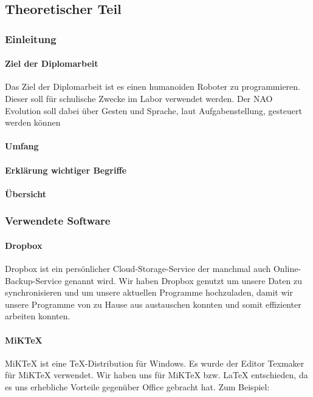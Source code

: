 \documentclass[12pt]{article}  %
\begin{document}
\addtocounter{page}{1}
\newpage
\tableofcontents
\newpage

\null\vfill
\begin{center}
 \part[Theoretischer Teil]{\centering Theoretischer Teil} 
\end{center}
\vfill
\newpage


\section{Einleitung}
	\subsection{Ziel der Diplomarbeit}
		Das Ziel der Diplomarbeit ist es einen humanoiden Roboter zu programmieren. Dieser 
		soll für schulische Zwecke im Labor verwendet werden. Der NAO Evolution soll dabei 
		über Gesten und Sprache, laut Aufgabenstellung, gesteuert werden können
	\subsection{Umfang}
	\subsection{Erklärung wichtiger Begriffe}
	\subsection{Übersicht}

\section{Verwendete Software}
	\subsection{Dropbox}
	
		Dropbox ist ein persönlicher Cloud-Storage-Service der manchmal auch Online- 
		Backup-Service genannt wird. Wir haben Dropbox genutzt um unsere Daten zu 	
		synchronisieren und um unsere aktuellen Programme hochzuladen, damit wir unsere 
		Programme von zu Hause aus austauschen konnten und somit effizienter arbeiten 
		konnten.
		
	\subsection{MiKTeX}
		MiKTeX ist eine TeX-Distribution für Windows. Es wurde der Editor Texmaker für 	
		MiKTeX verwendet. Wir haben uns für MiKTeX bzw. LaTeX entschieden, da es uns 
		erhebliche Vorteile gegenüber Office gebracht hat. 
		\newline Zum Beispiel:
		
\end{document}
